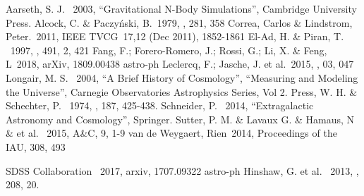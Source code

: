 \documentclass[preprint]{aastex62}
\begin{document}
  \begin{thebibliography}{}

     Aarseth, S. J. \ 2003, ``Gravitational N-Body Simulations'', Cambridge University Press.
     Alcock, C. \& Paczy\'nski, B.\ 1979, \nat, 281, 358    
     Correa, Carlos \& Lindstrom, Peter.\ 2011,  IEEE TVCG\ 17,12 (Dec 2011), 1852-1861
     El-Ad, H. \& Piran, T. \ 1997, \apj, 491, 2, 421
     Fang, F.; Forero-Romero, J.; Rossi, G.; Li, X. \& Feng, L\ 2018, arXiv, 1809.00438 astro-ph
     Leclercq, F.; Jasche, J. et al.\ 2015, \jcap, 03, 047
     Longair, M. S. \ 2004, ``A Brief History of Cosmology'', ``Measuring and Modeling the Universe'', Carnegie Observatories Astrophysics Series, Vol 2.
     Press, W. H. \& Schechter, P. \ 1974, \apj, 187, 425-438.
     Schneider, P. \ 2014, ``Extragalactic Astronomy and Cosmology'', Springer.
     Sutter, P. M. \& Lavaux G. \& Hamaus, N \& et al. \ 2015, A\&C, 9, 1-9
     van de Weygaert, Rien\ 2014, Proceedings of the IAU, 308, 493   

     SDSS Collaboration \ 2017, arxiv, 1707.09322 astro-ph
     Hinshaw, G. et al. \ 2013, \apjs, 208, 20.
  \end{thebibliography}                                                           
                       

\end{document}
